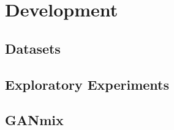 \section{Development}

\subsection{Datasets}

\subsection{Exploratory Experiments}

\subsection{GANmix}